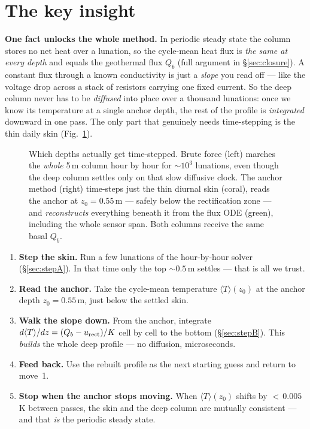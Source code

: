 \documentclass[11pt]{report}
\newcommand{\Tm}{\langle T\rangle}
\begin{document}
\section{The key insight}\label{sec:insight}

\begin{plain}
\textbf{One fact unlocks the whole method.} In periodic steady state the column
stores no net heat over a lunation, so the cycle-mean heat flux is \emph{the same
at every depth} and equals the geothermal flux $Q_b$ (full argument in
\S\ref{sec:closure}). A constant flux through a known conductivity is just a
\emph{slope} you read off --- like the voltage drop across a stack of resistors
carrying one fixed current. So the deep column never has to be \emph{diffused}
into place over a thousand lunations: once we know its temperature at a single
anchor depth, the rest of the profile is \emph{integrated} downward in one pass.
The only part that genuinely needs time-stepping is the thin daily skin
(Fig.~\ref{fig:truncation}).
\end{plain}

\begin{figure}[htbp]\centering

\caption{Which depths actually get time-stepped. Brute force (left) marches
the \emph{whole} 5\,m column hour by hour for ${\sim}10^{3}$ lunations, even
though the deep column settles only on that slow diffusive clock. The anchor
method (right) time-steps just the thin diurnal skin (coral), reads the anchor
at $z_0=0.55$\,m --- safely below the rectification zone --- and
\emph{reconstructs} everything beneath it from the flux ODE (green), including
the whole sensor span. Both columns receive the same basal $Q_b$.}
\label{fig:truncation}
\end{figure}

\begin{keypt}[title={The slope method in five moves}]
\begin{enumerate}[leftmargin=1.5em,itemsep=1pt]
\item \textbf{Step the skin.} Run a few lunations of the hour-by-hour solver
  (\S\ref{sec:stepA}). In that time only the top ${\sim}0.5$\,m settles --- that is
  all we trust.
\item \textbf{Read the anchor.} Take the cycle-mean temperature $\Tm(z_0)$ at the
  anchor depth $z_0=0.55$\,m, just below the settled skin.
\item \textbf{Walk the slope down.} From the anchor, integrate
  $d\Tm/dz=(Q_b-u_{\rm rect})/K$ cell by cell to the bottom (\S\ref{sec:stepB}).
  This \emph{builds} the whole deep profile --- no diffusion, microseconds.
\item \textbf{Feed back.} Use the rebuilt profile as the next starting guess and
  return to move~1.
\item \textbf{Stop when the anchor stops moving.} When $\Tm(z_0)$ shifts by
  ${<}\,0.005$\,K between passes, the skin and the deep column are mutually
  consistent --- and that \emph{is} the periodic steady state.
\end{enumerate}
\end{keypt}
\end{document}
